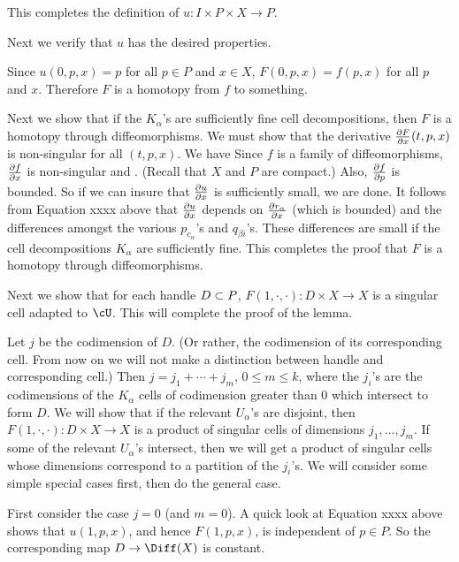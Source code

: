 \documentclass[11pt,leqno]{amsart}
\begin{document}
This completes the definition of $u: I \times P \times X \to P$.

\medskip

Next we verify that $u$ has the desired properties.

Since $u(0, p, x) = p$ for all $p\in P$ and $x\in X$, $F(0, p, x) = f(p, x)$ for all $p$ and $x$.
Therefore $F$ is a homotopy from $f$ to something.

Next we show that if the $K_\alpha$'s are sufficiently fine cell decompositions,
then $F$ is a homotopy through diffeomorphisms.
We must show that the derivative $\frac{\partial F}{\partial x}(t, p, x)$ is non-singular for all $(t, p, x)$.
We have
Since $f$ is a family of diffeomorphisms, $\frac{\partial f}{\partial x}$ is non-singular and
.
(Recall that $X$ and $P$ are compact.)
Also, $\frac{\partial f}{\partial p}$ is bounded.
So if we can insure that $\frac{\partial u}{\partial x}$ is sufficiently small, we are done.
It follows from Equation xxxx above that $\frac{\partial u}{\partial x}$ depends on $\frac{\partial r_\alpha}{\partial x}$
(which is bounded)
and the differences amongst the various $p_{c_\alpha}$'s and $q_{\beta i}$'s.
These differences are small if the cell decompositions $K_\alpha$ are sufficiently fine.
This completes the proof that $F$ is a homotopy through diffeomorphisms.

\medskip

Next we show that for each handle $D \subset P$, $F(1, \cdot, \cdot) : D\times X \to X$
is a singular cell adapted to $\cU$.
This will complete the proof of the lemma.

Let $j$ be the codimension of $D$.
(Or rather, the codimension of its corresponding cell.  From now on we will not make a distinction
between handle and corresponding cell.)
Then $j = j_1 + \cdots + j_m$, $0 \le m \le k$,
where the $j_i$'s are the codimensions of the $K_\alpha$
cells of codimension greater than 0 which intersect to form $D$.
We will show that
if the relevant $U_\alpha$'s are disjoint, then
$F(1, \cdot, \cdot) : D\times X \to X$
is a product of singular cells of dimensions $j_1, \ldots, j_m$.
If some of the relevant $U_\alpha$'s intersect, then we will get a product of singular
cells whose dimensions correspond to a partition of the $j_i$'s.
We will consider some simple special cases first, then do the general case.

First consider the case $j=0$ (and $m=0$).
A quick look at Equation xxxx above shows that $u(1, p, x)$, and hence $F(1, p, x)$,
is independent of $p \in P$.
So the corresponding map $D \to \Diff(X)$ is constant.
\end{document}
